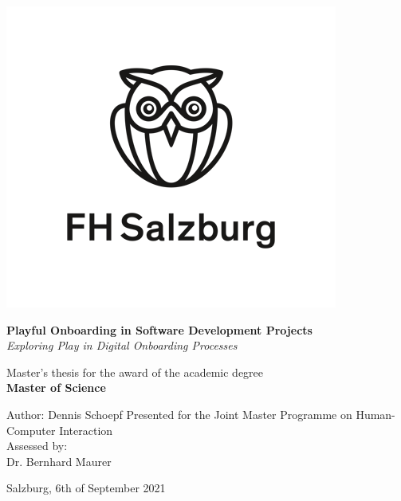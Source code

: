 \begin{titlepage}

  \raggedleft
  \includegraphics[totalheight=3.5cm]{./images/fhsalzburg.png}\par
  \vspace{1.6cm}

  \raggedright
  \begin{spacing}{1.1}
    {\huge\bfseries Playful Onboarding in Software Development Projects\\}
    \vspace{0.4cm}
    {\large \textit{Exploring Play in Digital Onboarding Processes}}
  \end{spacing}

  \vspace{1cm}
  {Master's thesis for the award of the academic degree\\}
  {\large\bfseries Master of Science\\}

  \vspace{0.3cm}
  {Author: Dennis Schoepf}
  \vfill
  {Presented for the Joint Master Programme on Human-Computer Interaction\\}
  \vspace{0.3cm}
  {Assessed by:\\}
  {Dr. Bernhard Maurer\\}
  \vspace{1cm}
  {Salzburg, 6th of September 2021\par}
\end{titlepage}
